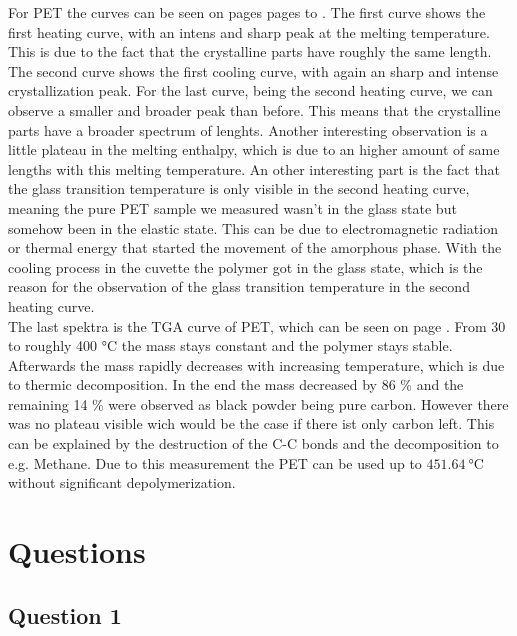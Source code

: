 \documentclass[10pt,a4paper,ngerman]{scrartcl}
\begin{document}
    For PET the curves can be seen on pages pages \pageref{pdf:pet-1hc} to \pageref{pdf:pet-2hc}. The first curve shows the first heating curve, with
    an intens and sharp peak at the melting temperature. This is due to the fact that the crystalline parts have roughly the same length.
    The second curve shows the first cooling curve, with again an sharp and intense crystallization peak. For the last curve, being the second 
    heating curve, we can observe a smaller and broader peak than before. This means that the crystalline parts have a broader spectrum of lenghts.
    Another interesting observation is a little plateau in the melting enthalpy, which is due to an higher amount of same lengths with this 
    melting temperature. 
    An other interesting part is the fact that the glass transition temperature is only visible in the second heating curve, meaning the pure PET 
    sample we measured wasn't in the glass state but somehow been in the elastic state. This can be due to electromagnetic radiation or thermal 
    energy that started the movement of the amorphous phase. With the cooling process in the cuvette the polymer got in the glass state, which is 
    the reason for the observation of the glass transition temperature in the second heating curve. \cite{polyskript}\\

    The last spektra is the TGA curve of PET, which can be seen on page \pageref{pdf:pet-tga}. From 30 to roughly 400 °C the mass stays constant 
    and the polymer stays stable. Afterwards the mass rapidly decreases with increasing temperature, which is due to thermic decomposition. In the end 
    the mass decreased by 86 \% and the remaining 14 \% were observed as black powder being pure carbon.
    However there was no plateau visible wich would be the case if there ist only carbon left. 
    This can be explained by the destruction of the C-C bonds and the decomposition to e.g. Methane. 
    Due to this measurement the PET can be 
    used up to $\SI{451.64}{\degreeCelsius}$ without significant depolymerization.






\section{Questions}

        \subsection{Question 1}
\end{document}
